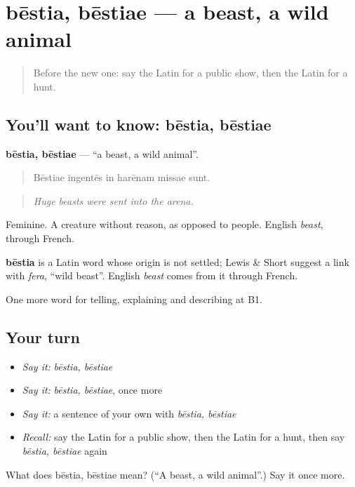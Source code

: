 \section[bēstia, bēstiae]{bēstia, bēstiae — a beast, a wild animal}

\label{lesson:LA-C336-bestia}



\begin{quote}
Before the new one: say the Latin for a public show, then the Latin for a hunt.
\end{quote}

\subsection*{You'll want to know: bēstia, bēstiae}
\textbf{bēstia, bēstiae} — \textquotedblleft{}a beast, a wild animal\textquotedblright{}.

\begin{quote}
Bēstiae ingentēs in harēnam missae sunt.
\end{quote}

\begin{quote}
\emph{Huge beasts were sent into the arena.}
\end{quote}

Feminine. A creature without reason, as opposed to people. English \emph{beast}, through French.

\begin{cousinweb}
\textbf{bēstia} is a Latin word whose origin is not settled; Lewis \& Short suggest a link with \emph{fera}, \textquotedblleft{}wild beast\textquotedblright{}. English \emph{beast} comes from it through French.
\end{cousinweb}

\begin{grammarlens}[title={What you've built}]
One more word for telling, explaining and describing at B1.
\end{grammarlens}

\subsection*{Your turn}
\begin{itemize}
\raggedright
  \item \emph{Say it:} \emph{bēstia, bēstiae}
  \item \emph{Say it:} \emph{bēstia, bēstiae}, once more
  \item \emph{Say it:} a sentence of your own with \emph{bēstia, bēstiae}
  \item \emph{Recall:} say the Latin for a public show, then the Latin for a hunt, then say \emph{bēstia, bēstiae} again
\end{itemize}

\begin{tcolorbox}[breakable,colback=teal!4,colframe=teal!35!black,title={Before you move on}]
What does bēstia, bēstiae mean? (\textquotedblleft{}A beast, a wild animal\textquotedblright{}.) Say it once more.
\end{tcolorbox}

